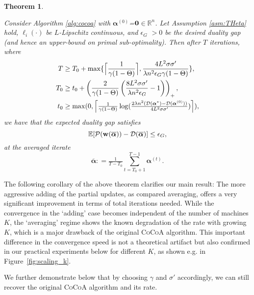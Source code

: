 \documentclass{article}
\newcommand{\cocoa}{\textsc{CoCoA}\xspace}
\newcommand{\Exp}{\mathbb{E}}                      %
\newcommand{\R}{\mathbb{R}}                      %
\newcommand{\calG}{G}
\newcommand{\wv}{ {\bf w}}
\newcommand{\alphav}{ {\boldsymbol \alpha}}
\newcommand{\0}{ {\bf 0}}
\newcommand{\vc}[2]{#1^{(#2)}}                   %
\newcommand{\bP}{\mathcal{P}}
\newcommand{\bD}{\mathcal{D}}
\theoremstyle{plain}
\newtheorem{theorem}{Theorem}
\theoremstyle{definition}
\begin{document}
\begin{theorem}
\label{thm:convergenceNonsmooth}
 
Consider Algorithm \ref{alg:cocoa}  with $\vc{\alphav}{0}$=${\bf 0}$$\in$$\R^n$. Let Assumption \ref{asm:THeta}
hold, $\ell_i(\cdot)$ be $L$-Lipschitz continuous,
and $\epsilon_\calG$ $>$$0$ be the desired duality gap (and hence an upper-bound on primal sub-optimality).
Then after $T$ iterations, where
\begin{align}\label{eq:dualityRequirements}
T
&\geq
T_0 + 
\max\{\Big\lceil \frac1{\gamma (1-\Theta)}\Big\rceil,\frac
{4L^2  \sigma   \sigma'}
{\lambda n^2 \epsilon_\calG
\gamma (1-\Theta)}\},  
\\
T_0
&\geq t_0+
\left(
\frac{2}{ \gamma (1-\Theta) }
\left(
\frac
{8L^2  \sigma   \sigma'}
{\lambda n^2 \epsilon_\calG}
-1
\right)
\right)_+,\notag
\\
t_0 &\geq 
  \max(0,\Big\lceil \tfrac1{\gamma (1-\Theta)}
\log(
\tfrac{
 2\lambda n^2 (\bD(\alphav^* )-\bD(\vc{\alphav}{0}))
  }{4 L^2 \sigma \sigma'}
  )
 \Big\rceil),\notag
\end{align}
we have that the expected duality gap satisfies
\[
\Exp[\bP( \wv(\overline\alphav)) - \bD(\overline \alphav) ] \leq \epsilon_\calG,
\]
at the averaged iterate
\begin{equation}\label{eq:averageOfAlphaDefinition}
\overline \alphav: = \tfrac1{T-T_0}\textstyle{\sum}_{t=T_0+1}^{T-1} \vc{\alphav}{t}. 
\end{equation}

\end{theorem}


The following corollary of the above theorem clarifies our main result: The more aggressive adding of the partial updates, as compared averaging, offers a very significant improvement in terms of total iterations needed.
While the convergence in the `adding' case becomes independent of the number of machines $K$, the `averaging' regime shows the known degradation of the rate with growing $K$, which is a major drawback of the original \cocoa algorithm. This important difference in the convergence speed is not a theoretical artifact but also confirmed in our practical experiments below for different $K$, as shown e.g. in Figure~\ref{fig:scaling_k}.

We further demonstrate below that by choosing $\gamma$ and $\sigma'$ accordingly, we can still recover the original \cocoa algorithm and its rate.
\end{document}
